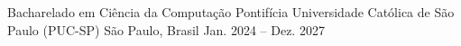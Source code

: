 \begin{cventries}
 \cventry
   {Bacharelado em Ciência da Computação}
   {Pontifícia Universidade Católica de São Paulo (PUC-SP)}
   {São Paulo, Brasil}
   {Jan. 2024 -- Dez. 2027}
   {}
\end{cventries}
